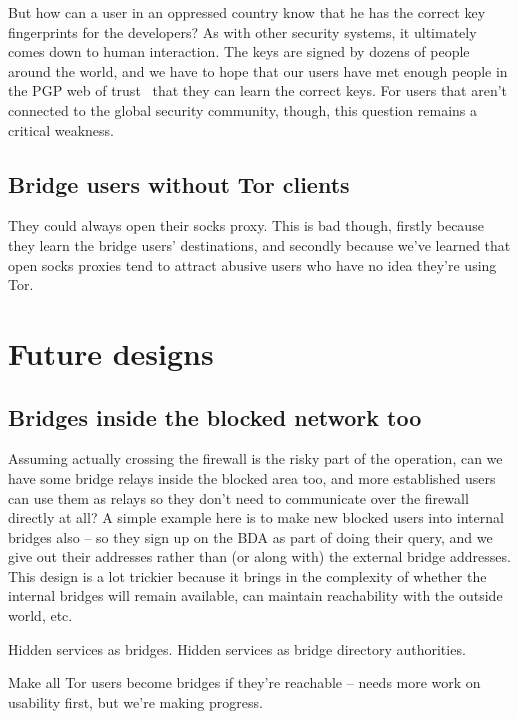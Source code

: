 \documentclass{llncs}
\begin{document}
But how can a user in an oppressed country know that he has the correct
key fingerprints for the developers? As with other security systems, it
ultimately comes down to human interaction. The keys are signed by dozens
of people around the world, and we have to hope that our users have met
enough people in the PGP web of trust~\cite{pgp-wot} that they can learn
the correct keys. For users that aren't connected to the global security
community, though, this question remains a critical weakness.

\subsection{Bridge users without Tor clients}

They could always open their socks proxy. This is bad though, firstly
because they learn the bridge users' destinations, and secondly because
we've learned that open socks proxies tend to attract abusive users who
have no idea they're using Tor.

\section{Future designs}

\subsection{Bridges inside the blocked network too}

Assuming actually crossing the firewall is the risky part of the
operation, can we have some bridge relays inside the blocked area too,
and more established users can use them as relays so they don't need to
communicate over the firewall directly at all? A simple example here is
to make new blocked users into internal bridges also -- so they sign up
on the BDA as part of doing their query, and we give out their addresses
rather than (or along with) the external bridge addresses. This design
is a lot trickier because it brings in the complexity of whether the
internal bridges will remain available, can maintain reachability with
the outside world, etc.

Hidden services as bridges. Hidden services as bridge directory authorities.

Make all Tor users become bridges if they're reachable -- needs more work
on usability first, but we're making progress.

 
\end{document}
